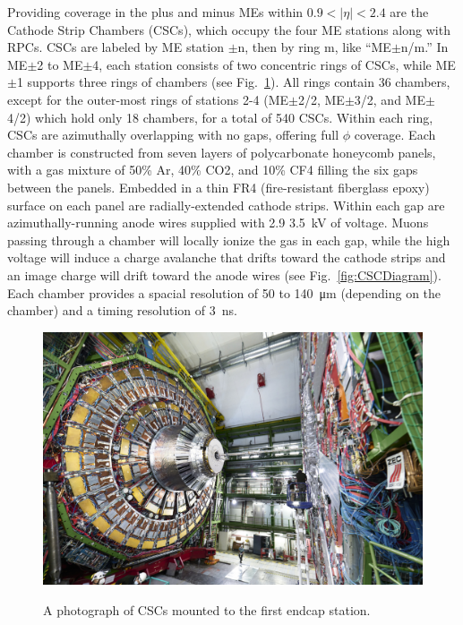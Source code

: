 
Providing coverage in the plus and minus MEs within $0.9<|\eta|<2.4$ are the Cathode Strip Chambers (CSCs), which occupy the four ME stations along with RPCs. CSCs are labeled by ME station $\pm$n, then by ring m, like ``ME$\pm$n/m.'' In ME$\pm$2 to ME$\pm$4, each station consists of two concentric rings of CSCs, while ME$\pm$1 supports three rings of chambers (see Fig.~\ref{fig:CSC}). All rings contain 36 chambers, except for the outer-most rings of stations 2-4 (ME$\pm$2/2, ME$\pm$3/2, and ME$\pm$4/2) which hold only 18 chambers, for a total of 540 CSCs. Within each ring, CSCs are azimuthally overlapping with no gaps, offering full $\phi$ coverage. Each chamber is constructed from seven layers of polycarbonate honeycomb panels, with a gas mixture of 50\% Ar, 40\% CO2, and 10\% CF4 filling the six gaps between the panels. Embedded in a thin FR4 (fire-resistant fiberglass epoxy) surface on each panel are radially-extended cathode strips. Within each gap are azimuthally-running anode wires supplied with 2.9 \SI{3.5}{kV} of voltage. Muons passing through a chamber will locally ionize the gas in each gap, while the high voltage will induce a charge avalanche that drifts toward the cathode strips and an image charge will drift toward the anode wires (see Fig.~\ref{fig:CSCDiagram}). Each chamber provides a spacial resolution of 50 to \SI{140}{\micro\meter} (depending on the chamber) and a timing resolution of \SI{3}{ns}.

\begin{figure}[H]
    \centering
    {\includegraphics[width=1\textwidth]{Images/CMS/CSC.jpg}}
    \caption{A photograph of CSCs mounted to the first endcap station.}
    \label{fig:CSC}
\end{figure}

